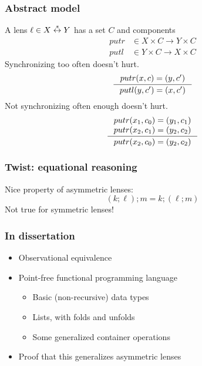 \documentclass[14pt]{beamer}
\begin{document}
\begin{frame}
    \frametitle{Abstract model}
    A lens $\ell \in X \stackrel s\leftrightarrow Y$ has a set $C$ and components
    \begin{align*}
        putr &\in X\times C \to Y\times C \\
        putl &\in Y\times C \to X\times C
    \end{align*}
    \pause
    Synchronizing too often doesn't hurt.
    \[\inference{putr(x,c)=(y,c')}{putl(y,c')=(x,c')}\]
    \pause
    \color{gray}Not synchronizing often enough doesn't hurt.
    \[\inference{putr(x_1,c_0)=(y_1,c_1) \\ putr(x_2,c_1) = (y_2,c_2)}{putr(x_2,c_0)=(y_2,c_2)}\]
\end{frame}

\begin{frame}
    \frametitle{Twist: equational reasoning}
    \begin{center}
    \end{center}
    Nice property of asymmetric lenses:
    \[(k;\ell);m = k;(\ell;m)\]
    \pause
    \alert{Not true for symmetric lenses!}
\end{frame}

\begin{frame}
    \frametitle{In dissertation}
    \begin{itemize}
        \item Observational equivalence
        \item Point-free functional programming language
            \begin{itemize}
                \item Basic (non-recursive) data types
                \item Lists, with folds and unfolds
                \item Some generalized container operations
            \end{itemize}
        \item Proof that this generalizes asymmetric lenses
    \end{itemize}
\end{frame}
\end{document}

